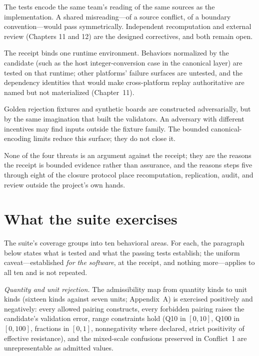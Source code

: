 \begin{threat}\label{evid:threat:sharedauthors}
The tests encode the same team's reading of the same sources as the implementation. A shared misreading---of a source conflict, of a boundary convention---would pass symmetrically. Independent recomputation and external review (Chapters 11 and 12) are the designed correctives, and both remain open.
\end{threat}

\begin{threat}\label{evid:threat:runtime}
The receipt binds one runtime environment. Behaviors normalized by the candidate (such as the host integer-conversion case in the canonical layer) are tested on that runtime; other platforms' failure surfaces are untested, and the dependency identities that would make cross-platform replay authoritative are named but not materialized (Chapter~11).
\end{threat}

\begin{threat}\label{evid:threat:fixtures}
Golden rejection fixtures and synthetic boards are constructed adversarially, but by the same imagination that built the validators. An adversary with different incentives may find inputs outside the fixture family. The bounded canonical-encoding limits reduce this surface; they do not close it.
\end{threat}

None of the four threats is an argument against the receipt; they are the reasons the receipt is bounded evidence rather than assurance, and the reasons steps five through eight of the closure protocol place recomputation, replication, audit, and review outside the project's own hands.

\section{What the suite exercises}\label{evid:sec:suite}

The suite's coverage groups into ten behavioral areas. For each, the paragraph below states what is tested and what the passing tests establish; the uniform caveat---established \emph{for the software}, at the receipt, and nothing more---applies to all ten and is not repeated.

\emph{Quantity and unit rejection.} The admissibility map from quantity kinds to unit kinds (sixteen kinds against seven units; Appendix~A) is exercised positively and negatively: every allowed pairing constructs, every forbidden pairing raises the candidate's validation error, range constraints hold (Q10 in $[0,10]$, Q100 in $[0,100]$, fractions in $[0,1]$, nonnegativity where declared, strict positivity of effective resistance), and the mixed-scale confusions preserved in Conflict~1 are unrepresentable as admitted values.

